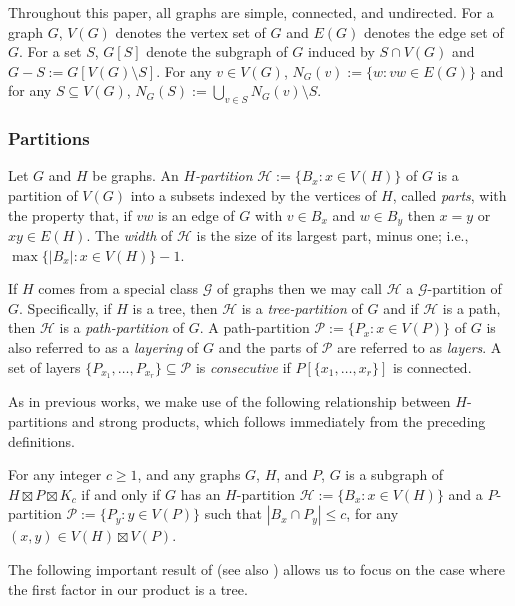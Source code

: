 \documentclass{patmorin}
\newcommand{\defin}[1]{\emph{\color{brightmaroon}#1}}
\begin{document}
Throughout this paper, all graphs are simple, connected, and undirected.  For a graph $G$, $V(G)$ denotes the vertex set of $G$ and $E(G)$ denotes the edge set of $G$.  For a set $S$, $G[S]$ denote the subgraph of $G$ induced by $S\cap V(G)$ and $G-S:=G[V(G)\setminus S]$.  For any $v\in V(G)$, $N_G(v):=\{w:vw\in E(G)\}$ and for any $S\subseteq V(G)$, $N_G(S):=\bigcup_{v\in S} N_G(v)\setminus S$.

\subsubsection{Partitions}

Let $G$ and $H$ be graphs.  An \defin{$H$-partition} $\mathcal{H}:=\{B_x:x\in V(H)\}$ of $G$ is a partition  of $V(G)$ into a subsets indexed by the vertices of $H$, called \defin{parts}, with the property that, if $vw$ is an edge of $G$ with $v\in B_x$ and $w\in B_y$ then $x=y$ or $xy\in E(H)$.  The \defin{width} of $\mathcal{H}$ is the size of its largest part, minus one; i.e., $\max\{|B_x|:x\in V(H)\}-1$.

If $H$ comes from a special class $\mathcal{G}$ of graphs then we may call $\mathcal{H}$ a $\mathcal{G}$-partition of $G$.  Specifically, if $H$ is a tree, then $\mathcal{H}$ is a \defin{tree-partition} of $G$ and if $\mathcal{H}$ is a path, then $\mathcal{H}$ is a \defin{path-partition} of $G$.  A path-partition $\mathcal{P}:=\{P_x:x\in V(P)\}$ of $G$ is also referred to as a \defin{layering} of $G$ and the parts of $\mathcal{P}$ are referred to as \defin{layers}.  A set of layers $\{P_{x_1},\ldots,P_{x_r}\}\subseteq\mathcal{P}$ is \defin{consecutive} if $P[\{x_1,\ldots,x_r\}]$ is connected.

As in previous works, we make use of the following relationship between $H$-partitions and strong products, which follows immediately from the preceding definitions.

\begin{obs}\label{partitions_vs_products}
  For any integer $c\ge 1$, and any graphs $G$, $H$, and $P$,  $G$ is a subgraph of $H\boxtimes P\boxtimes K_c$ if and only if $G$ has an $H$-partition $\mathcal{H}:=\{B_x:x\in V(H)\}$ and a $P$-partition $\mathcal{P}:=\{P_y:y\in V(P)\}$ such that $|B_x\cap P_y|\le c$, for any $(x,y)\in V(H)\boxtimes V(P)$.
\end{obs}

The following important result of \citet{ding.oporowski:some} (see also \citet{wood:on}) allows us to focus on the case where the first factor in our product is a tree.
\end{document}
